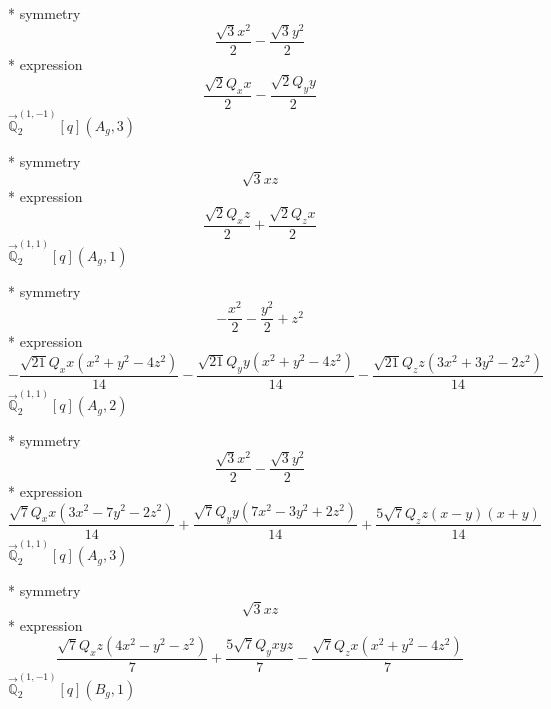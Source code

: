 \documentclass[fleqn,8pt]{jsarticle}
\begin{document}
\noindent\quad ** symmetry
\begin{dmath*}
\frac{\sqrt{3} x^{2}}{2} - \frac{\sqrt{3} y^{2}}{2}
\end{dmath*}
\noindent\quad ** expression
\begin{dmath*}
\frac{\sqrt{2} Q_{x} x}{2} - \frac{\sqrt{2} Q_{y} y}{2}
\end{dmath*}
\noindent\quad $\vec{\mathbb{Q}}_{2}^{(1,-1)}[q](A_{g},3)$

\noindent\quad ** symmetry
\begin{dmath*}
\sqrt{3} x z
\end{dmath*}
\noindent\quad ** expression
\begin{dmath*}
\frac{\sqrt{2} Q_{x} z}{2} + \frac{\sqrt{2} Q_{z} x}{2}
\end{dmath*}
\noindent\quad $\vec{\mathbb{Q}}_{2}^{(1,1)}[q](A_{g},1)$

\noindent\quad ** symmetry
\begin{dmath*}
- \frac{x^{2}}{2} - \frac{y^{2}}{2} + z^{2}
\end{dmath*}
\noindent\quad ** expression
\begin{dmath*}
- \frac{\sqrt{21} Q_{x} x \left(x^{2} + y^{2} - 4 z^{2}\right)}{14} - \frac{\sqrt{21} Q_{y} y \left(x^{2} + y^{2} - 4 z^{2}\right)}{14} - \frac{\sqrt{21} Q_{z} z \left(3 x^{2} + 3 y^{2} - 2 z^{2}\right)}{14}
\end{dmath*}
\noindent\quad $\vec{\mathbb{Q}}_{2}^{(1,1)}[q](A_{g},2)$

\noindent\quad ** symmetry
\begin{dmath*}
\frac{\sqrt{3} x^{2}}{2} - \frac{\sqrt{3} y^{2}}{2}
\end{dmath*}
\noindent\quad ** expression
\begin{dmath*}
\frac{\sqrt{7} Q_{x} x \left(3 x^{2} - 7 y^{2} - 2 z^{2}\right)}{14} + \frac{\sqrt{7} Q_{y} y \left(7 x^{2} - 3 y^{2} + 2 z^{2}\right)}{14} + \frac{5 \sqrt{7} Q_{z} z \left(x - y\right) \left(x + y\right)}{14}
\end{dmath*}
\noindent\quad $\vec{\mathbb{Q}}_{2}^{(1,1)}[q](A_{g},3)$

\noindent\quad ** symmetry
\begin{dmath*}
\sqrt{3} x z
\end{dmath*}
\noindent\quad ** expression
\begin{dmath*}
\frac{\sqrt{7} Q_{x} z \left(4 x^{2} - y^{2} - z^{2}\right)}{7} + \frac{5 \sqrt{7} Q_{y} x y z}{7} - \frac{\sqrt{7} Q_{z} x \left(x^{2} + y^{2} - 4 z^{2}\right)}{7}
\end{dmath*}
\noindent\quad $\vec{\mathbb{Q}}_{2}^{(1,-1)}[q](B_{g},1)$
\end{document}
